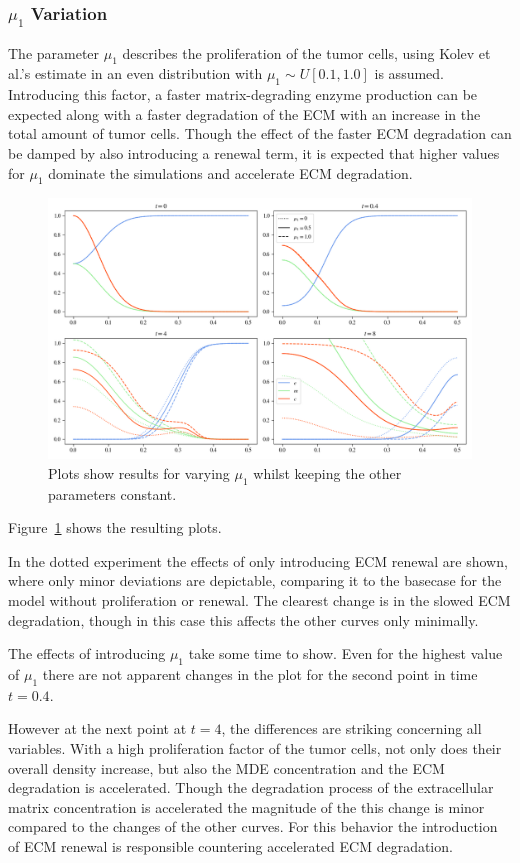 \subsubsection*{$\mu_1$ Variation}
The parameter $\mu_1$ describes the proliferation of the tumor cells, using Kolev et al.'s estimate in \cite{Kolev2010} an even distribution with $\mu_1 \sim U[0.1, 1.0]$ is assumed. Introducing this factor, a faster matrix-degrading enzyme production can be expected along with a faster degradation of the ECM with an increase in the total amount of tumor cells. Though the effect of the faster ECM degradation can be damped by also introducing a renewal term, it is expected that higher values for $\mu_1$ dominate the simulations and accelerate ECM degradation.
\begin{figure}[h!]
 \centering
 \includegraphics[width=\textwidth]{resources/images/prolif_mu_1_variation.png}
 \caption{Plots show results for varying $\mu_1$ whilst keeping the other parameters constant.}
 \label{fig:prolif_mu_1_variation}
\end{figure}
Figure~\ref{fig:prolif_mu_1_variation} shows the resulting plots.

In the dotted experiment the effects of only introducing ECM renewal are shown, where only minor deviations are depictable, comparing it to the basecase for the model without proliferation or renewal. The clearest change is in the slowed ECM degradation, though in this case this affects the other curves only minimally.

The effects of introducing $\mu_1$ take some time to show. Even for the highest value of $\mu_1$ there are not apparent changes in the plot for the second point in time $t=0.4$.

However at the next point at $t=4$, the differences are striking concerning all variables. With a high proliferation factor of the tumor cells, not only does their overall density increase, but also the MDE concentration and the ECM degradation is accelerated. Though the degradation process of the extracellular matrix concentration is accelerated the magnitude of the this change is minor compared to the changes of the other curves. For this behavior the introduction of ECM renewal is responsible countering accelerated ECM degradation.

